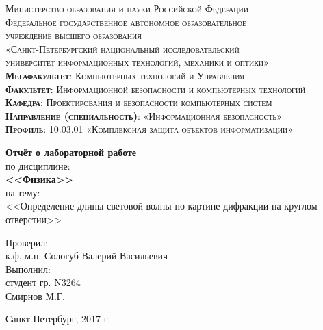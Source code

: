 \begin{titlepage}
	\begin{center}
		\textsc{
			\fontsize{12pt}{14pt}\selectfont
			Министерство образования и науки Российской Федерации\\
			Федеральное государственное автономное образовательное\\
			учреждение высшего образования\\
			«Санкт-Петербургский национальный исследовательский\\
			университет информационных технологий, механики и оптики»\\
			\textbf{Мегафакультет}:  Компьютерных технологий и Управления\\
			\textbf{Факультет}: Информационной безопасности и компьютерных технологий\\
			\textbf{Кафедра}: Проектирования и безопасности компьютерных систем\\
			\textbf{Направление (специальность)}: «Информационная безопасность»\\
			\textbf{Профиль}: 10.03.01 «Комплексная защита объектов информатизации»}

		\vfill

		\textbf{Отчёт о лабораторной работе}\\
		по дисциплине:\\
		\textbf{<<Физика>>}\\
		на тему:\\
		<<Определение длины световой волны по картине дифракции на круглом отверстии>>\\
	\end{center}

	\hfill
	\begin{flushright}
		Проверил:\\[2mm] 
		к.ф.-м.н. Сологуб Валерий Васильевич\\[2mm] 

		Выполнил:\\
		студент гр.  N3264\\
		Смирнов М.Г.\\[2mm]

	\end{flushright}%
	\vfill
	\begin{center}
		Санкт-Петербург, 2017 г.
	\end{center}
\end{titlepage}

